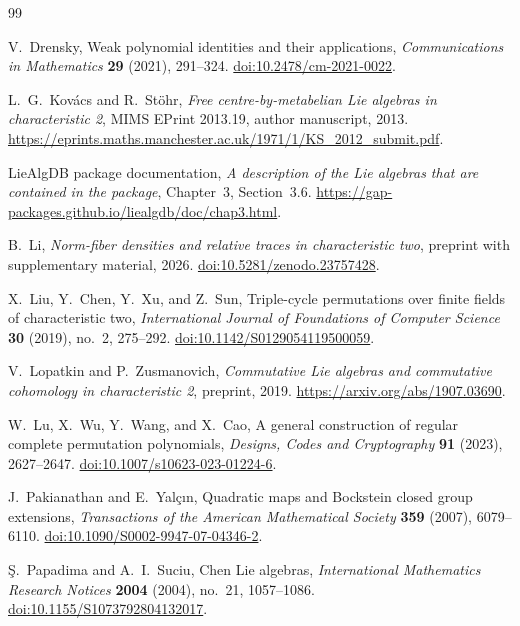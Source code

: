 \begin{thebibliography}{99}

V.~Drensky,
Weak polynomial identities and their applications,
\emph{Communications in Mathematics} \textbf{29} (2021), 291--324.
\href{https://doi.org/10.2478/cm-2021-0022}{doi:10.2478/cm-2021-0022}.

L.~G.~Kov\'acs and R.~St\"ohr,
\emph{Free centre-by-metabelian Lie algebras in characteristic 2},
MIMS EPrint 2013.19, author manuscript, 2013.
\url{https://eprints.maths.manchester.ac.uk/1971/1/KS_2012_submit.pdf}.

LieAlgDB package documentation,
\emph{A description of the Lie algebras that are contained in the package},
Chapter~3, Section~3.6.
\url{https://gap-packages.github.io/liealgdb/doc/chap3.html}.

B.~Li,
\emph{Norm-fiber densities and relative traces in characteristic two},
preprint with supplementary material, 2026.
\href{https://doi.org/10.5281/zenodo.23757428}{doi:10.5281/zenodo.23757428}.

X.~Liu, Y.~Chen, Y.~Xu, and Z.~Sun,
Triple-cycle permutations over finite fields of characteristic two,
\emph{International Journal of Foundations of Computer Science}
\textbf{30} (2019), no.~2, 275--292.
\href{https://doi.org/10.1142/S0129054119500059}{doi:10.1142/S0129054119500059}.

V.~Lopatkin and P.~Zusmanovich,
\emph{Commutative Lie algebras and commutative cohomology in characteristic 2},
preprint, 2019.
\url{https://arxiv.org/abs/1907.03690}.

W.~Lu, X.~Wu, Y.~Wang, and X.~Cao,
A general construction of regular complete permutation polynomials,
\emph{Designs, Codes and Cryptography} \textbf{91} (2023), 2627--2647.
\href{https://doi.org/10.1007/s10623-023-01224-6}{doi:10.1007/s10623-023-01224-6}.

J.~Pakianathan and E.~Yal\c{c}{\i}n,
Quadratic maps and Bockstein closed group extensions,
\emph{Transactions of the American Mathematical Society}
\textbf{359} (2007), 6079--6110.
\href{https://doi.org/10.1090/S0002-9947-07-04346-2}{doi:10.1090/S0002-9947-07-04346-2}.

\c{S}.~Papadima and A.~I.~Suciu,
Chen Lie algebras,
\emph{International Mathematics Research Notices}
\textbf{2004} (2004), no.~21, 1057--1086.
\href{https://doi.org/10.1155/S1073792804132017}{doi:10.1155/S1073792804132017}.


\end{thebibliography}
